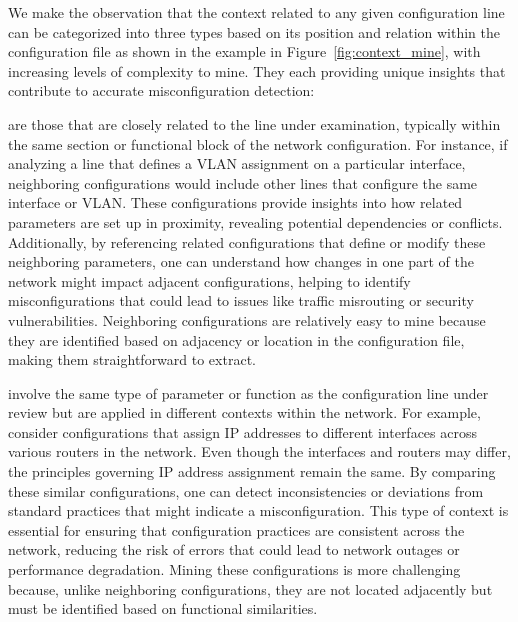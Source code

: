      We make the observation that the context related to any given configuration line can be categorized into three types based on its position and relation within the configuration file as shown in the example in Figure~\ref{fig:context_mine}, with increasing levels of complexity to mine. They each providing unique insights that contribute to accurate misconfiguration detection: 
    
     are those that are closely related to the line under examination, typically within the same section or functional block of the network configuration. For instance, if analyzing a line that defines a VLAN assignment on a particular interface, neighboring configurations would include other lines that configure the same interface or VLAN. These configurations provide insights into how related parameters are set up in proximity, revealing potential dependencies or conflicts. Additionally, by referencing related configurations that define or modify these neighboring parameters, one can understand how changes in one part of the network might impact adjacent configurations, helping to identify misconfigurations that could lead to issues like traffic misrouting or security vulnerabilities. Neighboring configurations are relatively easy to mine because they are identified based on adjacency or location in the configuration file, making them straightforward to extract.
        
     involve the same type of parameter or function as the configuration line under review but are applied in different contexts within the network. For example, consider configurations that assign IP addresses to different interfaces across various routers in the network. Even though the interfaces and routers may differ, the principles governing IP address assignment remain the same. By comparing these similar configurations, one can detect inconsistencies or deviations from standard practices that might indicate a misconfiguration. This type of context is essential for ensuring that configuration practices are consistent across the network, reducing the risk of errors that could lead to network outages or performance degradation. Mining these configurations is more challenging because, unlike neighboring configurations, they are not located adjacently but must be identified based on functional similarities.

